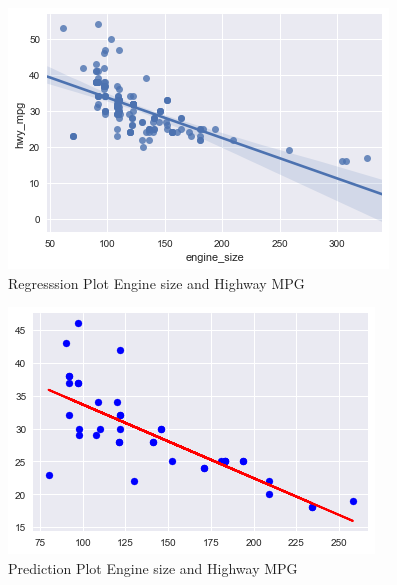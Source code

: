 \begin{figure}[htb]
\includegraphics[width=1.0\columnwidth]{images/reg_plot.png}
  \caption{Regresssion Plot Engine size and Highway MPG}
  \label{p:regplt}
\end{figure}

\begin{figure}[htb]
\includegraphics[width=1.0\columnwidth]{images/plot_pred_test_set.png}
  \caption{Prediction Plot Engine size and Highway MPG}
  \label{p:predplt}
\end{figure}


 

